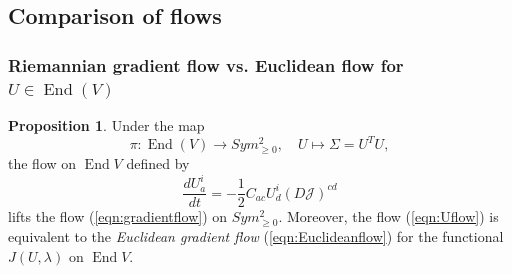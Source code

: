 \documentclass[a4paper]{article}
\theoremstyle{definition}
\newtheorem{prop}[thm]{Proposition}
\newcommand{\1}{\mathbbm{1}}
\DeclareMathOperator{\End}{End}
\begin{document}
	
	
	
	
	
	
	
	
	
	\subsection{Comparison of flows}
	
	
	
	
	
	\subsubsection{Riemannian gradient flow vs. Euclidean flow for $U\in \End(V)$}
	
	
	
	
	
	
	
	
	
	\begin{prop}\label{prop:Euclideanflow}
		Under the map
		\[
		\pi: \End(V) \to Sym^2_{\geq 0}, \quad U\mapsto \Sigma= U^T U,
		\]
		the flow on $\End{V}$ defined by  
		\begin{equation}\label{eqn:Uflow}
			\frac{dU_a^i}{dt}= - \frac{1}{2} C_{ac} U_d^i (D\mathcal{J})^{cd}
		\end{equation}
		lifts the flow (\ref{eqn:gradientflow}) on $Sym^2_{\geq 0}$. Moreover, the flow (\ref{eqn:Uflow}) is equivalent to the \emph{Euclidean gradient flow} (\ref{eqn:Euclideanflow}) for the functional $J(U,\lambda)$ on $\End{V}$.
	\end{prop}
	
\end{document}

